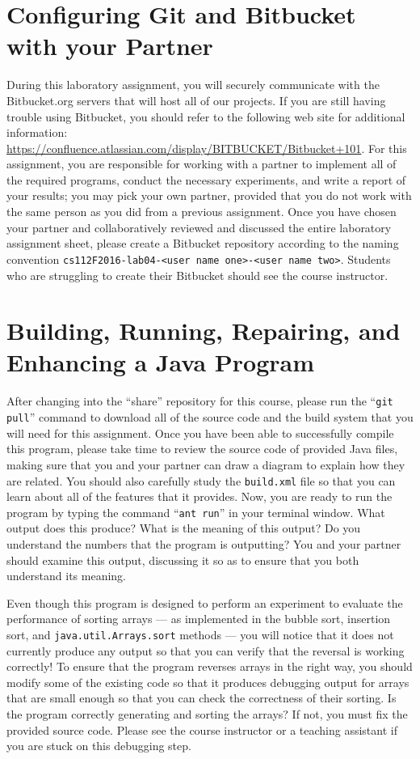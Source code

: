 \section*{Configuring Git and Bitbucket with your Partner}

During this laboratory assignment, you will securely communicate with the Bitbucket.org servers that will host all of
our projects.  If you are still having trouble using Bitbucket, you should refer to the following web site for
additional information: \url{https://confluence.atlassian.com/display/BITBUCKET/Bitbucket+101}.  For this assignment,
you are responsible for working with a partner to implement all of the required programs, conduct the necessary
experiments, and write a report of your results; you may pick your own partner, provided that you do not work with the
same person as you did from a previous assignment. Once you have chosen your partner and collaboratively reviewed and
discussed the entire laboratory assignment sheet, please create a Bitbucket repository according to the naming
convention {\tt cs112F2016-lab04-<user name one>-<user name two>}. Students who are struggling to create their Bitbucket
should see the course instructor.

\section*{Building, Running, Repairing, and Enhancing a Java Program}

After changing into the ``share'' repository for this course, please run the ``{\tt git pull}'' command to download all
of the source code and the build system that you will need for this assignment. Once you have been able to successfully
compile this program, please take time to review the source code of provided Java files, making sure that you and your
partner can draw a diagram to explain how they are related. You should also carefully study the {\tt build.xml} file so
that you can learn about all of the features that it provides. Now, you are ready to run the program by typing the
command ``{\tt ant run}'' in your terminal window. What output does this produce? What is the meaning of this output? Do
you understand the numbers that the program is outputting? You and your partner should examine this output, discussing
it so as to ensure that you both understand its meaning.

Even though this program is designed to perform an experiment to evaluate the performance of sorting arrays --- as
implemented in the bubble sort, insertion sort, and {\tt java.util.Arrays.sort} methods --- you will notice that it does
not currently produce any output so that you can verify that the reversal is working correctly! To ensure that the
program reverses arrays in the right way, you should modify some of the existing code so that it produces debugging
output for arrays that are small enough so that you can check the correctness of their sorting. Is the program
correctly generating and sorting the arrays? If not, you must fix the provided source code. Please see the course
instructor or a teaching assistant if you are stuck on this debugging step.

